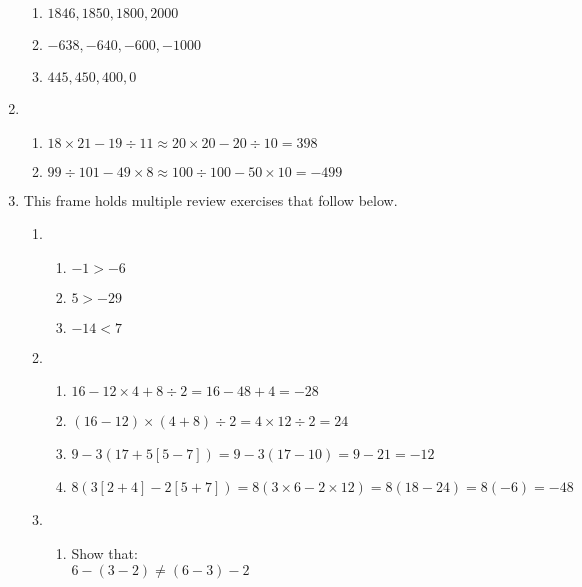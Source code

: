 \documentclass[fleqn]{article}
\begin{document}
\begin{enumerate}[label=\textbf{\arabic*.},labelsep=2em]
\begin{enumerate}[label=\textbf{(\alph*)}]
\item $ 1846, 1850, 1800, 2000 $
\item $ -638, -640, -600, -1000 $
\item $ 445, 450, 400, 0 $
\end{enumerate}

\setcounter{enumi}{13}
\item 
\begin{enumerate}[label=\textbf{(\alph*)}]
\item $ 18 \times 21 - 19 \div 11 \approx 20 \times 20 - 20 \div 10 = 398 $
\item $ 99 \div 101 - 49 \times 8 \approx 100 \div 100 - 50 \times 10 = -499 $
\end{enumerate}

\setcounter{enumi}{16}
\item This frame holds multiple review exercises that follow below.

\begin{enumerate}[label=\textbf{\arabic*.} ,labelsep=2em]
\item

\begin{enumerate}[label=\textbf{(\alph*)},labelsep=2em]
\item $ -1 > -6 $
\item $ 5 > -29 $
\item $ -14 < 7 $ 
\end{enumerate}

\item

\begin{enumerate}[label = \textbf{(\alph*)},labelsep=2em]
\item $ 16 - 12 \times 4 + 8 \div 2 = 16 - 48 + 4 = -28 $
\item $ (16 - 12) \times (4 + 8) \div 2 = 4 \times 12 \div 2 = 24 $
\item $ 9 - 3(17 +5[5 - 7]) = 9 - 3(17 - 10) = 9 - 21 = -12$
\item $ 8(3[2 + 4] - 2[5 + 7]) = 8(3 \times 6 - 2 \times 12) = 8(18 - 24) = 8(-6) = -48$ 
\end{enumerate}

\item
\begin{enumerate}[label = \textbf{(\alph*)},labelsep=2em]

\item
Show that: \\
$ 6 - (3 - 2) \neq (6 -3) - 2 $


\end{enumerate}
\end{enumerate}
\end{enumerate}
\end{document}
